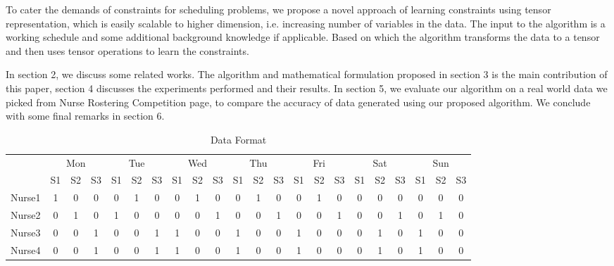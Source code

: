 \documentclass{article}
\begin{document}
To cater the demands of constraints for scheduling problems, we propose a novel approach of learning constraints using tensor representation, which is easily scalable to higher dimension, i.e. increasing number of variables in the data. The input to the algorithm is a working schedule and some additional background knowledge if applicable. Based on which the algorithm transforms the data to a tensor and then uses tensor operations to learn the constraints. 

In section 2, we discuss some related works. The algorithm and mathematical formulation proposed in section 3 is the main contribution of this paper, section 4 discusses the experiments performed and their results. In section 5, we evaluate our algorithm on a real world data we picked from Nurse Rostering Competition page, to compare the accuracy of data generated using our proposed algorithm. We conclude with some final remarks in section 6.

\begin{table*}[h!]
\begin{center}
\caption{Data Format}
\label{my-label}
\begin{tabular}{c|c|c|c|c|c|c|c|c|c|c|c|c|c|c|c|c|c|c|c|c|c|}
\cline{2-22}
\multicolumn{1}{l|}{}        & \multicolumn{3}{c|}{Mon} & \multicolumn{3}{c|}{Tue} & \multicolumn{3}{c|}{Wed} & \multicolumn{3}{c|}{Thu} & \multicolumn{3}{c|}{Fri} & \multicolumn{3}{c|}{Sat} & \multicolumn{3}{c|}{Sun} \\ \cline{2-22} 
\multicolumn{1}{l|}{}        & S1     & S2     & S3     & S1     & S2     & S3     & S1     & S2     & S3     & S1     & S2     & S3     & S1     & S2     & S3     & S1     & S2     & S3     & S1     & S2     & S3     \\ \hline
\multicolumn{1}{|c|}{Nurse1} & 1      & 0      & 0      & 0      & 1      & 0      & 0      & 1      & 0      & 0      & 1      & 0      & 0      & 1      & 0      & 0      & 0      & 0      & 0      & 0      & 0      \\ \hline
\multicolumn{1}{|c|}{Nurse2} & 0      & 1      & 0      & 1      & 0      & 0      & 0      & 0      & 1      & 0      & 0      & 1      & 0      & 0      & 1      & 0      & 0      & 1      & 0      & 1      & 0      \\ \hline
\multicolumn{1}{|c|}{Nurse3} & 0      & 0      & 1      & 0      & 0      & 1      & 1      & 0      & 0      & 1      & 0      & 0      & 1      & 0      & 0      & 0      & 1      & 0      & 1      & 0      & 0      \\ \hline
\multicolumn{1}{|c|}{Nurse4} & 0      & 0      & 1      & 0      & 0      & 1      & 1      & 0      & 0      & 1      & 0      & 0      & 1      & 0      & 0      & 0      & 1      & 0      & 1      & 0      & 0      \\ \hline
\end{tabular}
\end{center}
\end{table*}
\end{document}
